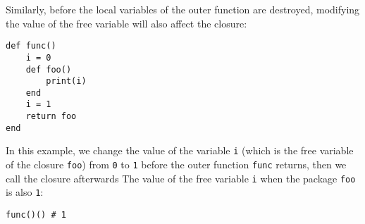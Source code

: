 Similarly, before the local variables of the outer function are destroyed, modifying the value of the free variable will also affect the closure:
\begin{lstlisting}[language=berry]
def func()
    i = 0
    def foo()
        print(i)
    end
    i = 1
    return foo
end
\end{lstlisting}
In this example, we change the value of the variable \texttt{i} (which is the free variable of the closure \texttt{foo}) from \texttt{0} to \texttt{1} before the outer function \texttt{func} returns, then we call the closure afterwards The value of the free variable \texttt{i} when the package \texttt{foo} is also \texttt{1}:
\begin{lstlisting}[language=berry]
func()() # 1
\end{lstlisting}

